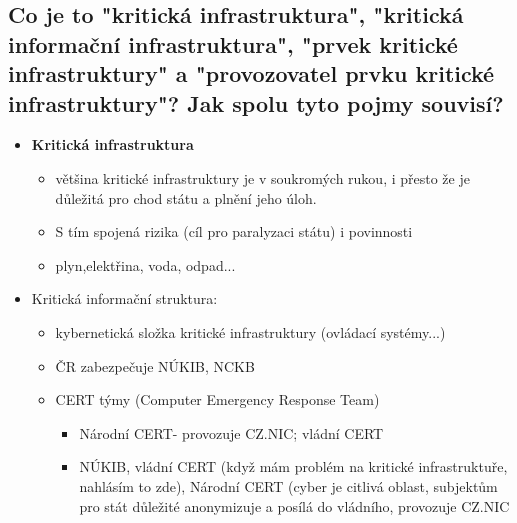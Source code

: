 \subsection{Co je to "kritická infrastruktura", "kritická informační infrastruktura", "prvek kritické infrastruktury" a 
"provozovatel prvku kritické infrastruktury"? Jak spolu tyto pojmy souvisí?}
\begin{itemize}
    \item \textbf{Kritická infrastruktura}
    \begin{itemize}
        \item většina kritické infrastruktury je v soukromých rukou, i přesto že je důležitá pro chod státu a plnění jeho úloh.
        \item S tím spojená rizika (cíl pro paralyzaci státu) i povinnosti
        \item plyn,elektřina, voda, odpad...
    \end{itemize}
    \item Kritická informační struktura:
    \begin{itemize}
        \item kybernetická složka kritické infrastruktury (ovládací systémy...)
        \item ČR zabezpečuje NÚKIB, NCKB
        \item CERT týmy (Computer Emergency Response Team)
        \begin{itemize}
            \item Národní CERT- provozuje CZ.NIC; vládní CERT
            \item NÚKIB, vládní CERT (když mám problém na kritické infrastruktuře, nahlásím to zde), Národní CERT 
(cyber je citlivá oblast, subjektům pro stát důležité anonymizuje a posílá do vládního, provozuje 
CZ.NIC
        \end{itemize}
    \end{itemize}
\end{itemize}


